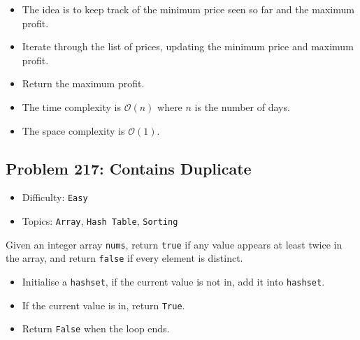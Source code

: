 \begin{itemize}
    \item The idea is to keep track of the minimum price seen so far and the maximum profit.
    \item Iterate through the list of prices, updating the minimum price and maximum profit.
    \item Return the maximum profit.
    \item The time complexity is \(\mathcal{O}(n)\) where \(n\) is the number of days.
    \item The space complexity is \(\mathcal{O}(1)\).
\end{itemize}

\subsection*{Problem 217: Contains Duplicate}
\begin{itemize}
    \setlength\itemsep{0.1em}  %
    \setlength\parskip{0pt}    %
    \item Difficulty: \texttt{Easy}
    \item Topics: \texttt{Array}, \texttt{Hash Table}, \texttt{Sorting}
\end{itemize}

\begin{tcolorbox}[colback=gray!5!white, colframe=gray!80!black, boxrule=0.5pt, arc=2pt, left=6pt, right=6pt, top=6pt, bottom=6pt]
    Given an integer array \texttt{nums}, return \texttt{true} if any value appears at least twice in the
    array, and return \texttt{false} if every element is distinct.
\end{tcolorbox}

\begin{itemize}
    \item Initialise a \texttt{hashset}, if the current value is not in, add it 
    into \texttt{hashset}.
    \item If the current value is in, return \texttt{True}.
    \item Return \texttt{False} when the loop ends.
\end{itemize}

